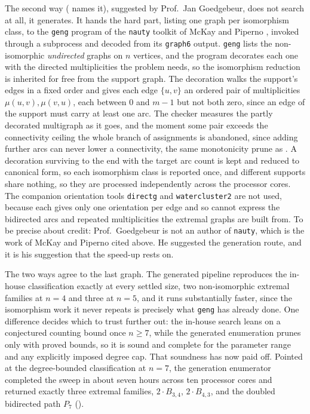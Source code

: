 The second way ( names it), suggested by Prof.\ Jan Goedgebeur, does not search at all, it generates. It hands the hard part, listing one graph per isomorphism class, to the \texttt{geng} program of the \texttt{nauty} toolkit of McKay and Piperno \cite{McKayPiperno14}, invoked through a subprocess and decoded from its \texttt{graph6} output. \texttt{geng} lists the non-isomorphic \emph{undirected} graphs on $n$ vertices, and the program decorates each one with the directed multiplicities the problem needs, so the isomorphism reduction is inherited for free from the support graph. The decoration walks the support's edges in a fixed order and gives each edge $\{u,v\}$ an ordered pair of multiplicities $\mu(u,v), \mu(v,u)$, each between $0$ and $m-1$ but not both zero, since an edge of the support must carry at least one arc. The checker measures the partly decorated multigraph as it goes, and the moment some pair exceeds the connectivity ceiling the whole branch of assignments is abandoned, since adding further arcs can never lower a connectivity, the same monotonicity prune as . A decoration surviving to the end with the target arc count is kept and reduced to canonical form, so each isomorphism class is reported once, and different supports share nothing, so they are processed independently across the processor cores. The companion orientation tools \texttt{directg} and \texttt{watercluster2} are not used, because each gives only one orientation per edge and so cannot express the bidirected arcs and repeated multiplicities the extremal graphs are built from. To be precise about credit: Prof.\ Goedgebeur is not an author of \texttt{nauty}, which is the work of McKay and Piperno cited above. He suggested the generation route, and it is his suggestion that the speed-up rests on.

The two ways agree to the last graph. The generated pipeline reproduces the in-house classification exactly at every settled size, two non-isomorphic extremal families at $n = 4$ and three at $n = 5$, and it runs substantially faster, since the isomorphism work it never repeats is precisely what \texttt{geng} has already done. One difference decides which to trust further out: the in-house search leans on a conjectured counting bound once $n \ge 7$, while the generated enumeration prunes only with proved bounds, so it is sound and complete for the parameter range and any explicitly imposed degree cap. That soundness has now paid off. Pointed at the degree-bounded classification at $n = 7$, the generation enumerator completed the sweep in about seven hours across ten processor cores and returned exactly three extremal families, $2 \cdot B_{3,4}$, $2 \cdot B_{4,3}$, and the doubled bidirected path $P_7$ ().

